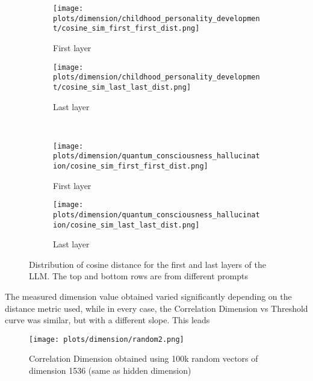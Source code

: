 \documentclass[a4paper,12pt]{article}
\begin{document}
\begin{figure}[H]
    \centering
    \begin{subfigure}[b]{0.48\linewidth}
        \centering
        \texttt{[image: plots/dimension/childhood\_personality\_development/cosine\_sim\_first\_first\_dist.png]}
        \caption{First layer}
    \end{subfigure}\hfill
    \begin{subfigure}[b]{0.48\linewidth}
        \centering
        \texttt{[image: plots/dimension/childhood\_personality\_development/cosine\_sim\_last\_last\_dist.png]}
        \caption{Last layer}
    \end{subfigure}
    \\[0.5em]
    \centering
    \begin{subfigure}[b]{0.48\linewidth}
        \centering
        \texttt{[image: plots/dimension/quantum\_consciousness\_hallucination/cosine\_sim\_first\_first\_dist.png]}
        \caption{First layer}
    \end{subfigure}\hfill
    \begin{subfigure}[b]{0.48\linewidth}
        \centering
        \texttt{[image: plots/dimension/quantum\_consciousness\_hallucination/cosine\_sim\_last\_last\_dist.png]}
        \caption{Last layer}
    \end{subfigure}
    \caption{Distribution of cosine distance for the first and last layers of the LLM. The top and bottom rows are from different prompts}
    \label{fig:distribution_cos_dist}
\end{figure}


The measured dimension value obtained varied significantly depending on the distance metric used, %
while in every case, the Correlation Dimension vs Threshold curve was similar, but with a different slope. This leads


\begin{figure}[H]
    \centering
    \texttt{[image: plots/dimension/random2.png]}
    \caption{Correlation Dimension obtained using 100k random vectors of dimension 1536 (same as hidden dimension)}
    \label{fig:random_vectors_dimension}
\end{figure}

\end{document}
